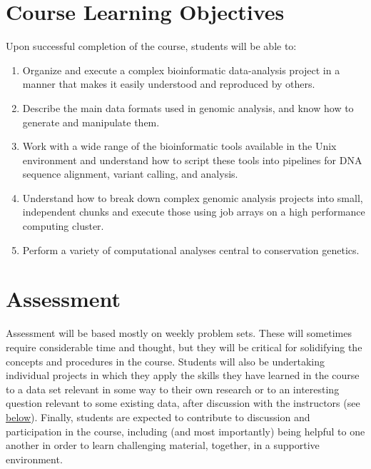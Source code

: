 \documentclass[]{book}
\providecommand{\tightlist}{%
  \setlength{\itemsep}{0pt}\setlength{\parskip}{0pt}}
\begin{document}
\hypertarget{course-learning-objectives}{%
\section*{Course Learning Objectives}\label{course-learning-objectives}}

Upon successful completion of the course, students will be able to:

\begin{enumerate}
\def\labelenumi{\arabic{enumi}.}
\tightlist
\item
  Organize and execute a complex bioinformatic data-analysis project in a manner that makes it easily understood and reproduced by others.
\item
  Describe the main data formats used in genomic analysis, and know how to generate and manipulate them.
\item
  Work with a wide range of the bioinformatic tools available in the Unix environment and understand how to script these tools into pipelines for DNA sequence alignment, variant calling, and analysis.
\item
  Understand how to break down complex genomic analysis projects into small, independent chunks and execute those using job arrays on a high performance computing cluster.
\item
  Perform a variety of computational analyses central to conservation genetics.
\end{enumerate}

\hypertarget{assessment}{%
\section*{Assessment}\label{assessment}}

Assessment will be based mostly on weekly problem sets. These will sometimes require
considerable time and thought, but they will be critical for solidifying the concepts
and procedures in the course. Students will also be undertaking individual projects
in which they apply the skills they have learned in the course to a data set
relevant in some way to their own research or to an interesting question relevant
to some existing data, after discussion with the instructors (see \protect\hyperlink{indproj}{below}).
Finally, students are expected to contribute to discussion and participation in the course,
including (and most importantly) being helpful to one another in order to learn challenging material,
together, in a supportive environment.
\end{document}
